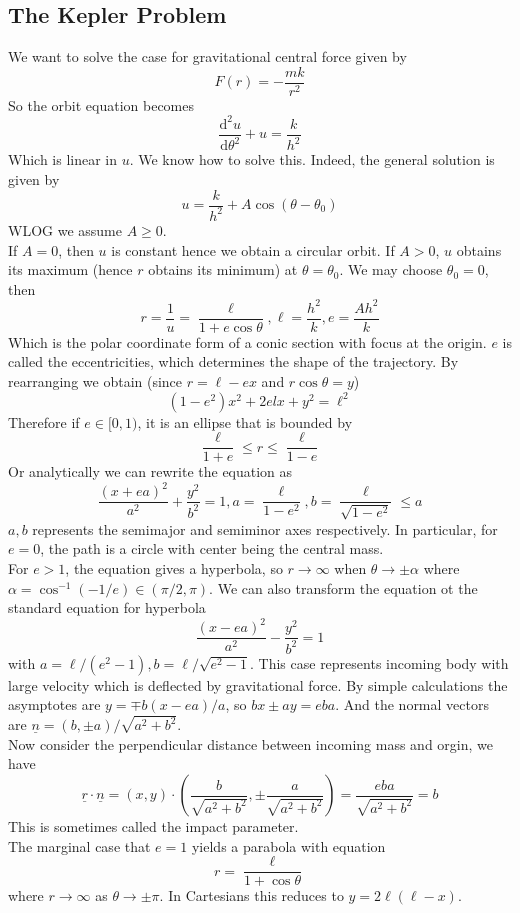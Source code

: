 \subsection{The Kepler Problem}
We want to solve the case for gravitational central force given by
$$F(r)=-\frac{mk}{r^2}$$
So the orbit equation becomes
$$\frac{\mathrm d^2u}{\mathrm d\theta^2}+u=\frac{k}{h^2}$$
Which is linear in $u$.
We know how to solve this.
Indeed, the general solution is given by
$$u=\frac{k}{h^2}+A\cos(\theta-\theta_0)$$
WLOG we assume $A\ge 0$.\\
If $A=0$, then $u$ is constant hence we obtain a circular orbit.
If $A>0$, $u$ obtains its maximum (hence $r$ obtains its minimum) at $\theta=\theta_0$.
We may choose $\theta_0=0$, then
$$r=\frac{1}{u}=\frac{\ell}{1+e\cos\theta},\ell=\frac{h^2}{k},e=\frac{Ah^2}{k}$$
Which is the polar coordinate form of a conic section with focus at the origin.
$e$ is called the eccentricities, which determines the shape of the trajectory.
By rearranging we obtain (since $r=\ell-ex$ and $r\cos\theta=y$)
$$(1-e^2)x^2+2elx+y^2=\ell^2$$
Therefore if $e\in[0,1)$, it is an ellipse that is bounded by
$$\frac{\ell}{1+e}\le r\le\frac{\ell}{1-e}$$
Or analytically we can rewrite the equation as
$$\frac{(x+ea)^2}{a^2}+\frac{y^2}{b^2}=1,a=\frac{\ell}{1-e^2},b=\frac{\ell}{\sqrt{1-e^2}}\le a$$
$a,b$ represents the semimajor and semiminor axes respectively.
In particular, for $e=0$, the path is a circle with center being the central mass.\\
For $e>1$, the equation gives a hyperbola, so $r\to\infty$ when $\theta\to\pm\alpha$ where $\alpha=\cos^{-1}(-1/e)\in (\pi/2,\pi)$.
We can also transform the equation ot the standard equation for hyperbola
$$\frac{(x-ea)^2}{a^2}-\frac{y^2}{b^2}=1$$
with $a=\ell/(e^2-1),b=\ell/\sqrt{e^2-1}$.
This case represents incoming body with large velocity which is deflected by gravitational force.
By simple calculations the asymptotes are $y=\mp b(x-ea)/a$, so $bx\pm ay=eba$.
And the normal vectors are $\underline{n}=(b,\pm a)/\sqrt{a^2+b^2}$.\\
Now consider the perpendicular distance between incoming mass and orgin, we have
$$\underline{r}\cdot\underline{n}=(x,y)\cdot\left( \frac{b}{\sqrt{a^2+b^2}},\pm\frac{a}{\sqrt{a^2+b^2}} \right)=\frac{eba}{\sqrt{a^2+b^2}}=b$$
This is sometimes called the impact parameter.\\
The marginal case that $e=1$ yields a parabola with equation
$$r=\frac{\ell}{1+\cos\theta}$$
where $r\to \infty$ as $\theta\to\pm\pi$.
In Cartesians this reduces to $y=2\ell(\ell-x)$.\\
